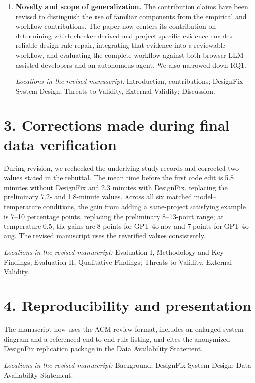 \documentclass[11pt]{article}
\newcommand{\location}[1]{%
  \par\nobreak\smallskip
  \textit{Locations in the revised manuscript:} #1.
}
\begin{document}
\begin{enumerate}
\location{Evaluation I, ``Methodology---Metrics''; Evaluation II,
``Methodology---Measures''; Threats to Validity, Construct Validity}

\item \textbf{Novelty and scope of generalization.}
The contribution claims have been revised to distinguish the use of familiar
components from the empirical and workflow contributions.  The paper now
centers its contribution on determining which checker-derived and
project-specific evidence enables reliable design-rule repair, integrating
that evidence into a reviewable workflow, and evaluating the complete workflow
against both browser-LLM-assisted developers and an autonomous agent. We also narrowed down RQ1.


\location{Introduction, contributions; DesignFix System Design; Threats to
Validity, External Validity; Discussion}

\end{enumerate}

\section*{3. Corrections made during final data verification}

During revision, we rechecked the underlying study records and corrected two
values stated in the rebuttal.  The mean time before the first code edit is
5.8 minutes without DesignFix and 2.3 minutes with DesignFix, replacing the
preliminary 7.2- and 1.8-minute values.  Across all six matched
model--temperature conditions, the gain from adding a same-project satisfying
example is 7--10 percentage points, replacing the preliminary 8--13-point
range; at temperature 0.5, the gains are 8 points for GPT-4o-nov and 7 points
for GPT-4o-aug.  The revised manuscript uses the reverified values
consistently.

\location{Evaluation I, Methodology and Key Findings; Evaluation II,
Qualitative Findings; Threats to Validity, External Validity}

\section*{4. Reproducibility and presentation}

The manuscript now uses the ACM review format, includes an enlarged system
diagram and a referenced end-to-end rule listing, and cites the anonymized
DesignFix replication package in the Data Availability Statement.

\location{Background; DesignFix System Design; Data Availability Statement}
\end{document}
